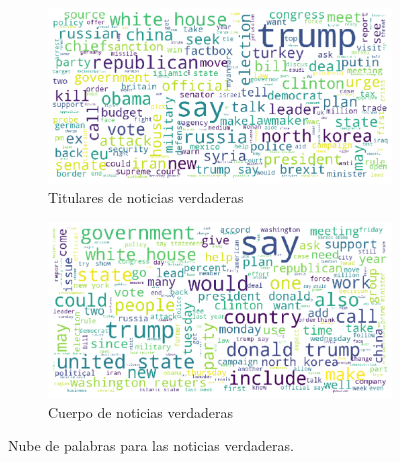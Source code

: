 {\begin{figure}
\centering
\begin{subfigure}{.47\textwidth}
    \centering
    \includegraphics[width=\textwidth]{imagenes/wordcloud_titulares_verdaderas.pdf}
    \caption{Titulares de noticias verdaderas}
    \label{fig:tit-true}
\end{subfigure}%
\newline
\begin{subfigure}{.5\textwidth}
    \centering
    \includegraphics[width=\textwidth]{imagenes/wordclouds_cuerpo_verdaderas.pdf}
    \caption{Cuerpo de noticias verdaderas}
    \label{fig:text-true}
\end{subfigure}
\caption{Nube de palabras para las noticias verdaderas.}
\label{fig:fake}
\end{figure}

}

